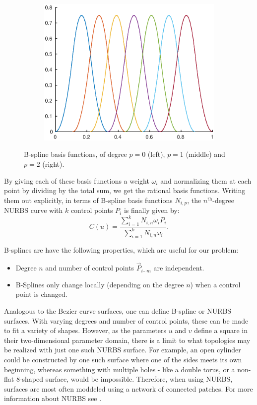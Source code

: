 \begin{figure}
\begin{subfigure}[b]{.3\linewidth}
  \includegraphics[width=\linewidth]{Pictures/basisquadratic}
  \label{fig:lognorm_quadratic}
\end{subfigure}
\caption{B-spline basis functions, of degree $p=0$ (left), $p=1$ (middle) and $p=2$ (right).}
\label{fig:bsplineBases}
\end{figure}


By giving each of these basis functions a weight $\omega_i$ and normalizing them at each point by dividing by the total sum, we get the rational basis functions. Writing them out explicitly, in terms of B-spline basis functions $N_{i,p}$, the $n^{\text{th}}$-degree NURBS curve with $k$ control points $P_i$ is finally given by:
\begin{equation}
C(u) = \frac{\sum_{i=1}^{k}N_{i,n}\omega_{i}P_{i}}{\sum_{i=1}^{k}N_{i,n}\omega_{i}}.
\end{equation}

B-splines are have the following properties, which are useful for our problem:
\begin{itemize}
\item Degree $n$ and number of control points $\vec{P}_{i\cdots m}$ are independent.
\item B-Splines only change locally (depending on the degree $n$) when a control point is changed.
\end{itemize}

Analogous to the Bezier curve surfaces, one can define B-spline or NURBS surfaces. With varying degrees and number of control points, these can be made to fit a variety of shapes. However, as the parameters $u$ and $v$ define a square in their two-dimensional parameter domain, there is a limit to what topologies may be realized with just one such NURBS surface. For example, an open cylinder could be constructed by one such surface where one of the sides meets its own beginning, whereas something with multiple holes - like a double torus, or a non-flat 8-shaped surface, would be impossible. Therefore, when using NURBS, surfaces are most often moddeled using a network of connected patches.  For more information about NURBS see \cite{farin1999nurbs}.
